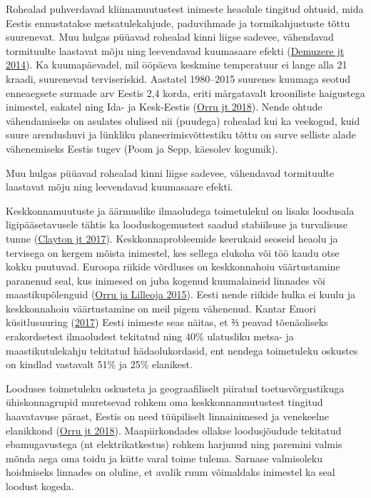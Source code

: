 \documentclass[estonian,]{article}
\begin{document}
Rohealad puhverdavad kliimamuutustest inimeste heaolule tingitud ohtusid, mida Eestis ennustatakse metsatulekahjude, paduvihmade ja tormikahjustuste tõttu suurenevat. Muu hulgas püüavad rohealad kinni liigse sadevee, vähendavad tormituulte laastavat mõju ning leevendavad kuumasaare efekti (\protect\hyperlink{Demuzere2014}{Demuzere jt 2014}). Ka kuumapäevadel, mil ööpäeva keskmine temperatuur ei lange alla 21 kraadi, suurenevad terviseriskid. Aastatel 1980--2015 suurenes kuumaga seotud enneaegsete surmade arv Eestis 2,4 korda, eriti märgatavalt krooniliste haigustega inimestel, eakatel ning Ida- ja Kesk-Eestis (\protect\hyperlink{Orru2018}{Orru jt 2018}). Nende ohtude vähendamiseks on asulates olulised nii (puudega) rohealad kui ka veekogud, kuid suure arendushuvi ja lünkliku planeerimisvõttestiku tõttu on surve selliste alade vähenemiseks Eestis tugev (Poom ja Sepp, käesolev kogumik).

\begin{blockquote-right}
Muu hulgas püüavad rohealad kinni liigse sadevee, vähendavad tormituulte
laastavat mõju ning leevendavad kuumasaare efekti.
\end{blockquote-right}

Keskkonnamuutuste ja äärmuslike ilmaoludega toimetulekul on lisaks loodusala ligipääsetavusele tähtis ka looduskogemustest saadud stabiilsuse ja turvalisuse tunne (\protect\hyperlink{Clayton2017}{Clayton jt 2017}). Keskkonnaprobleemide keerukaid seoseid heaolu ja tervisega on kergem mõista inimestel, kes sellega elukoha või töö kaudu otse kokku puutuvad. Euroopa riikide võrdluses on keskkonnahoiu väärtustamine paranenud seal, kus inimesed on juba kogenud kuumalaineid linnades või maastikupõlenguid (\protect\hyperlink{Orru2015}{Orru ja Lilleoja 2015}). Eesti nende riikide hulka ei kuulu ja keskkonnahoiu väärtustamine on meil pigem vähenenud. Kantar Emori küsitlusuuring (\protect\hyperlink{Kantar2017}{2017}) Eesti inimeste seas näitas, et ⅔ peavad tõenäoliseks erakordsetest ilmaoludest tekitatud ning 40\% ulatusliku metsa- ja maastikutulekahju tekitatud hädaolukordasid, ent nendega toimetuleku oskustes on kindlad vastavalt 51\% ja 25\% elanikest.

Looduses toimetuleku oskusteta ja geograafiliselt piiratud toetusvõrgustikuga ühiskonnagrupid muretsevad rohkem oma keskkonnamuutustest tingitud haavatavuse pärast, Eestis on need tüüpiliselt linnainimesed ja venekeelne elanikkond (\protect\hyperlink{Orru2018}{Orru jt 2018}). Maapiirkondades ollakse loodusjõudude tekitatud ebamugavustega (nt elektrikatkestus) rohkem harjunud ning paremini valmis mõnda aega oma toidu ja kütte varal toime tulema. Sarnase valmisoleku hoidmiseks linnades on oluline, et avalik ruum võimaldaks inimestel ka seal loodust kogeda.
\end{document}
